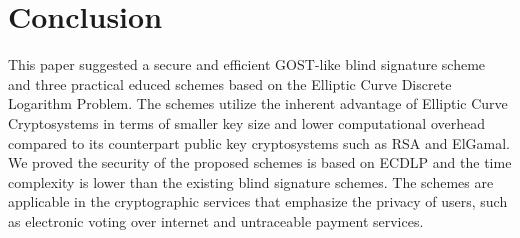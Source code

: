 \documentclass[journal,onecolumn,draftcls]{IEEEtran}
\begin{document}
\section{Conclusion}
This paper suggested a secure and efficient GOST-like blind signature scheme and three practical educed schemes based on the Elliptic Curve Discrete Logarithm Problem. The schemes utilize the inherent advantage of Elliptic Curve Cryptosystems in terms of smaller key size and lower computational overhead compared to its counterpart public key cryptosystems such as RSA and ElGamal. We proved the security of the proposed schemes is based on ECDLP and the time complexity is lower than the existing blind signature schemes. The schemes are applicable in the cryptographic services that emphasize the privacy of users, such as electronic voting over internet and untraceable payment services.
\end{document}
